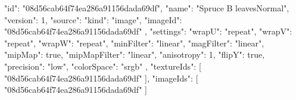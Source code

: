 {
  "id": "08d56cab64f74ea286a91156dada69df",
  "name": "Spruce B leavesNormal",
  "version": 1,
  "source": {
    "kind": "image",
    "imageId": "08d56cab64f74ea286a91156dada69df"
  },
  "settings": {
    "wrapU": "repeat",
    "wrapV": "repeat",
    "wrapW": "repeat",
    "minFilter": "linear",
    "magFilter": "linear",
    "mipMap": true,
    "mipMapFilter": "linear",
    "anisotropy": 1,
    "flipY": true,
    "precision": "low",
    "colorSpace": "srgb"
  },
  "textureIds": [
    "08d56cab64f74ea286a91156dada69df"
  ],
  "imageIds": [
    "08d56cab64f74ea286a91156dada69df"
  ]
}
